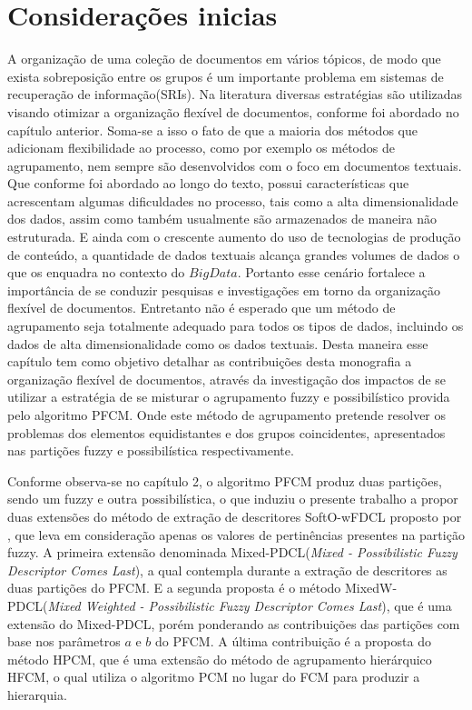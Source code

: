 \section{Considerações inicias}
A organização de uma coleção de documentos em vários tópicos, de modo que exista sobreposição
entre os grupos é um importante problema em sistemas de recuperação de informação(SRIs). Na
literatura diversas estratégias são utilizadas visando otimizar a organização flexível de
documentos, conforme foi abordado no capítulo anterior. Soma-se a isso o fato de que a maioria dos
métodos que adicionam flexibilidade ao processo, como por exemplo  os métodos de agrupamento, nem
sempre são desenvolvidos com o foco em documentos textuais. Que conforme foi abordado ao longo do
texto, possui características que acrescentam algumas dificuldades no processo, tais como a alta
dimensionalidade dos dados, assim como também usualmente são armazenados de maneira não estruturada.
E ainda com o crescente aumento do uso de tecnologias de produção de conteúdo, a quantidade de dados
textuais alcança grandes volumes de dados o que os enquadra no contexto do $Big Data$. 
Portanto esse cenário fortalece a importância de se conduzir pesquisas e investigações em torno da
organização flexível de documentos. Entretanto não é esperado que um método de agrupamento seja
totalmente adequado para todos os tipos de dados, incluindo os dados de alta dimensionalidade como
os dados textuais\cite{Steinbach2004}. Desta maneira esse capítulo tem como objetivo detalhar as 
contribuições
desta monografia a organização flexível de documentos, através da investigação dos impactos de se
utilizar a estratégia de se misturar o agrupamento fuzzy e possibilístico provida pelo algoritmo
PFCM. Onde este método de agrupamento pretende resolver os problemas dos elementos equidistantes e 
dos grupos
coincidentes, apresentados nas partições fuzzy e possibilística respectivamente. 

Conforme observa-se no capítulo 2, o algoritmo PFCM produz duas
partições, sendo um fuzzy e outra possibilística, o que induziu o presente trabalho a propor duas extensões do
método de extração de descritores SoftO-wFDCL proposto por \cite{Nogueira2013}, que leva em
consideração apenas os valores de pertinências presentes na partição fuzzy. A primeira extensão
denominada Mixed-PDCL({\it Mixed - Possibilistic Fuzzy Descriptor Comes Last\/}), 
a qual contempla durante a extração de descritores as duas partições do PFCM.
E a segunda proposta é o método 
MixedW-PDCL({\it Mixed Weighted - Possibilistic Fuzzy Descriptor Comes Last\/}), 
que é uma extensão do Mixed-PDCL, porém ponderando as
contribuições das partições com base nos parâmetros $a$ e $b$ do PFCM. A última contribuição é a
proposta do método HPCM, que é uma extensão do método de agrupamento hierárquico HFCM, o qual
utiliza o algoritmo PCM no lugar do FCM para produzir a hierarquia.


